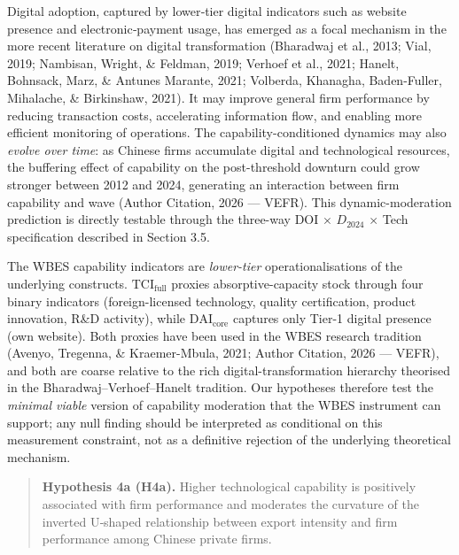\documentclass[12pt,a4paper]{article}
\begin{document}
Digital adoption, captured by lower‑tier digital indicators such as
website presence and electronic‑payment usage, has emerged as a focal
mechanism in the more recent literature on digital transformation
(Bharadwaj et al., 2013; Vial, 2019; Nambisan, Wright, \& Feldman, 2019;
Verhoef et al., 2021; Hanelt, Bohnsack, Marz, \& Antunes Marante, 2021;
Volberda, Khanagha, Baden-Fuller, Mihalache, \& Birkinshaw, 2021). It
may improve general firm performance by reducing transaction costs,
accelerating information flow, and enabling more efficient monitoring of
operations. The capability-conditioned dynamics may also \emph{evolve
over time}: as Chinese firms accumulate digital and technological
resources, the buffering effect of capability on the post-threshold
downturn could grow stronger between 2012 and 2024, generating an
interaction between firm capability and wave (Author Citation, 2026 ---
VEFR). This dynamic-moderation prediction is directly testable through
the three-way DOI \(\times\) \(D_{2024}\) \(\times\) Tech specification
described in Section 3.5.

The WBES capability indicators are \emph{lower-tier} operationalisations
of the underlying constructs. \(\mathrm{TCI}_{\text{full}}\) proxies
absorptive-capacity stock through four binary indicators
(foreign-licensed technology, quality certification, product innovation,
R\&D activity), while \(\mathrm{DAI}_{\text{core}}\) captures only
Tier-1 digital presence (own website). Both proxies have been used in
the WBES research tradition (Avenyo, Tregenna, \& Kraemer-Mbula, 2021;
Author Citation, 2026 --- VEFR), and both are coarse relative to the
rich digital-transformation hierarchy theorised in the
Bharadwaj--Verhoef--Hanelt tradition. Our hypotheses therefore test the
\emph{minimal viable} version of capability moderation that the WBES
instrument can support; any null finding should be interpreted as
conditional on this measurement constraint, not as a definitive
rejection of the underlying theoretical mechanism.

\begin{quote}
\textbf{Hypothesis 4a (H4a).} Higher technological capability is
positively associated with firm performance and moderates the curvature
of the inverted U‑shaped relationship between export intensity and firm
performance among Chinese private firms.
\end{quote}
\end{document}

